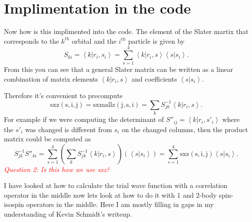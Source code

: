 \documentclass[12pt]{extarticle}
\newcommand{\braket}[2]{\left< #1 | #2 \right>}
\newcommand{\mycolor}[1]{\textit{\textcolor{red}{#1}}}
\begin{document}
\section{Implimentation in the code}
Now how is this implimented into the code. The element of the Slater martix that corresponds to the $k^{th}$ orbital and the $i^{th}$ particle is given by
\begin{equation}
  S_{ki} = \braket{k}{r_i,s_i} = \sum_{s=1}^4 \braket{k}{r_i,s}\braket{s}{s_i}.
\end{equation}
From this you can see that a general Slater matrix can be written as a linear combination of matrix elements $\braket{k}{r_i,s}$ and coefficients $\braket{s}{s_i}$.

Therefore it's convenient to precompute
\begin{equation}
  \mathrm{sxz(s,i,j) = sxmallz(j,s,i)} = \sum_k S^{-1}_{jk} \braket{k}{r_i,s}.
\end{equation}
For example if we were computing the determinant of $S''_{ij} = \braket{k}{r_i,s'_i}$ where the $s'_i$ was changed is different from $s_i$ on the changed columns, then the product matrix could be computed as
\begin{equation}
  S^{-1}_{jk}S''_{ki} = \sum_{s=1}^4 \left(\sum_k S^{-1}_{jk} \braket{k}{r_i,s}\right) \left(\braket{s}{s_i}\right) = \sum_{s=1}^4 \mathrm{sxz(s,i,j)} \braket{s}{s_i}.
\end{equation}
\mycolor{Question 2: Is this how we use sxz?}

I have looked at how to calculate the trial wave function with a correlation operator in the middle now lets look at how to do it with 1 and 2-body spin-isospin operators in the middle. Here I am mostly filling in gaps in my understanding of Kevin Schmidt's writeup.
\end{document}
